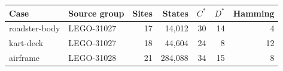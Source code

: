 \begin{tabular}{llrrrrr}\toprule
Case & Source group & Sites & States & $C^*$ & $D^*$ & Hamming \\\midrule
roadster-body & LEGO-31027 & 17 & 14,012 & 30 & 14 & 4 \\
kart-deck & LEGO-31027 & 18 & 44,604 & 24 & 8 & 12 \\
airframe & LEGO-31028 & 21 & 284,088 & 34 & 15 & 8 \\
\bottomrule\end{tabular}
